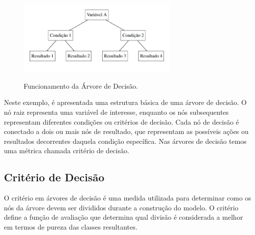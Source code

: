 \documentclass[12pt,oneside,a4paper,chapter=TITLE,
			   english,brazil]{abntex2}
\begin{document}



\begin{figure}[H]
  \centering
   \caption[Funcionamento da Árvore de Decisão]{Funcionamento da Árvore de Decisão.}
  \includegraphics[width=0.7\textwidth]{arvore.png}
  \label{fig:funarvore}
\end{figure}
\begin{flushleft}
\vspace{-2em}
\centering
{}
\end{flushleft}




Neste exemplo, é apresentada uma estrutura básica de uma árvore de decisão. O nó raiz representa uma variável de interesse, enquanto os nós subsequentes representam diferentes condições ou critérios de decisão. Cada nó de decisão é conectado a dois ou mais nós de resultado, que representam as possíveis ações ou resultados decorrentes daquela condição específica. Nas  árvores de decisão  temos uma métrica chamada critério de decisão.

\subsection{Critério de Decisão}

O critério em árvores de decisão é uma medida utilizada para determinar como os nós da árvore devem ser divididos durante a construção do modelo. O critério define a função de avaliação que determina qual divisão é considerada a melhor em termos de pureza das classes resultantes. 
\end{document}
